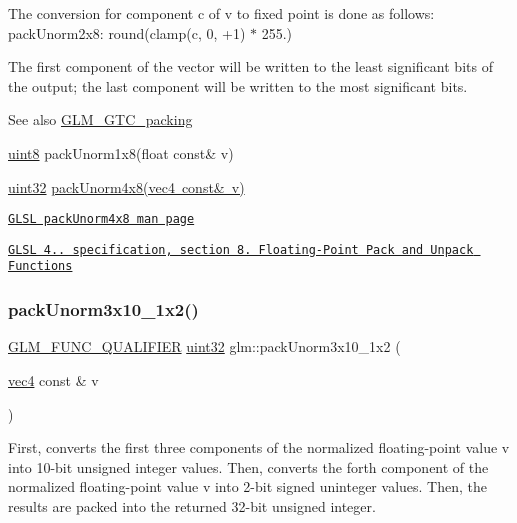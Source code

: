 The conversion for component c of v to fixed point is done as follows\+: pack\+Unorm2x8\+: round(clamp(c, 0, +1) $\ast$ 255.)

The first component of the vector will be written to the least significant bits of the output; the last component will be written to the most significant bits.

\begin{DoxySeeAlso}{See also}
\mbox{\hyperlink{group__gtc__packing}{G\+L\+M\+\_\+\+G\+T\+C\+\_\+packing}} 

\mbox{\hyperlink{group__gtc__type__precision_ga1a7dcd8aac97cc8020817c94049deff2}{uint8}} pack\+Unorm1x8(float const\& v) 

\mbox{\hyperlink{group__gtc__type__precision_ga202b6a53c105fcb7e531f9b443518451}{uint32}} \mbox{\hyperlink{group__core__func__packing_gaf7d2f7341a9eeb4a436929d6f9ad08f2}{pack\+Unorm4x8(vec4 const\& v)}} 

\href{http://www.opengl.org/sdk/docs/manglsl/xhtml/packUnorm4x8.xml}{\tt G\+L\+SL pack\+Unorm4x8 man page} 

\href{http://www.opengl.org/registry/doc/GLSLangSpec.4.20.8.pdf}{\tt G\+L\+SL 4.. specification, section 8. Floating-\/\+Point Pack and Unpack Functions} 
\end{DoxySeeAlso}
\mbox{\label{group__gtc__packing_ga2cf2d11b40bd48639110456fd74c2e33}} 
\subsubsection{\texorpdfstring{pack\+Unorm3x10\+\_\+1x2()}{packUnorm3x10\_1x2()}}
{\footnotesize\ttfamily \mbox{\hyperlink{setup_8hpp_a33fdea6f91c5f834105f7415e2a64407}{G\+L\+M\+\_\+\+F\+U\+N\+C\+\_\+\+Q\+U\+A\+L\+I\+F\+I\+ER}} \mbox{\hyperlink{group__gtc__type__precision_ga202b6a53c105fcb7e531f9b443518451}{uint32}} glm\+::pack\+Unorm3x10\+\_\+1x2 (\begin{DoxyParamCaption}\item[{\mbox{\hyperlink{group__core__types_ga5881b1b022d7fd1b7218f5916532dd02}{vec4}} const \&}]{v }\end{DoxyParamCaption})}

First, converts the first three components of the normalized floating-\/point value v into 10-\/bit unsigned integer values. Then, converts the forth component of the normalized floating-\/point value v into 2-\/bit signed uninteger values. Then, the results are packed into the returned 32-\/bit unsigned integer.


